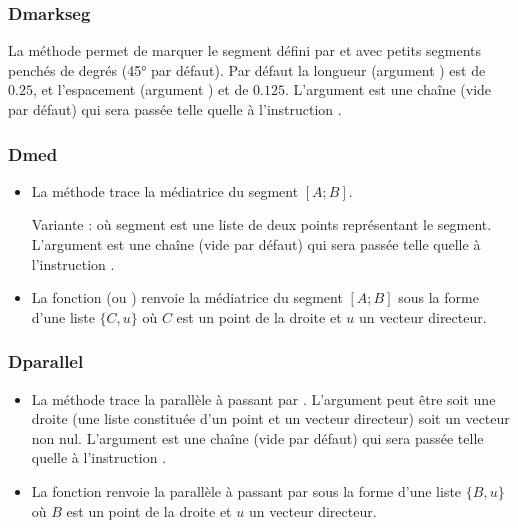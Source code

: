 \subsubsection{Dmarkseg}
La méthode  permet de marquer le segment défini par  et  avec  petits segments penchés de  degrés (45° par défaut). Par défaut la longueur (argument ) est de $0.25$, et l'espacement (argument ) et de $0.125$. L'argument  est une chaîne (vide par défaut) qui sera passée telle quelle à l'instruction \drawcmd.

\subsubsection{Dmed}
\begin{itemize}
    \item La méthode  trace la médiatrice du segment $[A;B]$.

  Variante :  où segment est une liste de deux points représentant le segment. L'argument  est une chaîne (vide par défaut) qui sera passée telle quelle à l'instruction \drawcmd. \arguScale
  \item La fonction  (ou ) renvoie la médiatrice du segment $[A;B]$ sous la forme d'une liste $\{C,u\}$ où $C$ est un point de la droite et $u$ un vecteur directeur.
\end{itemize}

\subsubsection{Dparallel}
\begin{itemize}
    \item La méthode  trace la parallèle à  passant par . L'argument  peut être soit une droite (une liste constituée d'un point et un vecteur directeur) soit un vecteur non nul. L'argument  est une chaîne (vide par défaut) qui sera passée telle quelle à l'instruction \drawcmd. \arguScale
    \item La fonction  renvoie la parallèle à  passant par  sous la forme d'une liste $\{B,u\}$ où $B$ est un point de la droite et $u$ un vecteur directeur.
\end{itemize}

